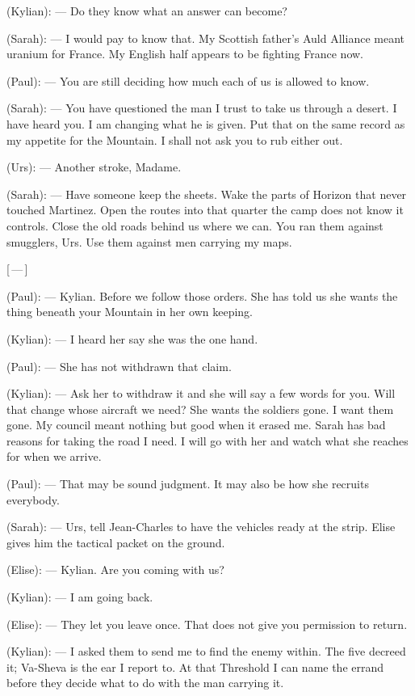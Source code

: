 \begin{room}
(Kylian): --- Do they know what an answer can become?

(Sarah): --- I would pay to know that. My Scottish father's Auld Alliance meant uranium for France. My English half appears to be fighting France now.

(Paul): --- You are still deciding how much each of us is allowed to know.

(Sarah): --- You have questioned the man I trust to take us through a desert. I have heard you. I am changing what he is given. Put that on the same record as my appetite for the Mountain. I shall not ask you to rub either out.

(Urs): --- Another stroke, Madame.

(Sarah): --- Have someone keep the sheets. Wake the parts of Horizon that never touched Martinez. Open the routes into that quarter the camp does not know it controls. Close the old roads behind us where we can. You ran them against smugglers, Urs. Use them against men carrying my maps.

\centerline{[\,---\,]}

(Paul): --- Kylian. Before we follow those orders. She has told us she wants the thing beneath your Mountain in her own keeping.

(Kylian): --- I heard her say she was the one hand.

(Paul): --- She has not withdrawn that claim.

(Kylian): --- Ask her to withdraw it and she will say a few words for you. Will that change whose aircraft we need? She wants the soldiers gone. I want them gone. My council meant nothing but good when it erased me. Sarah has bad reasons for taking the road I need. I will go with her and watch what she reaches for when we arrive.

(Paul): --- That may be sound judgment. It may also be how she recruits everybody.

(Sarah): --- Urs, tell Jean-Charles to have the vehicles ready at the strip. Elise gives him the tactical packet on the ground.

(Elise): --- Kylian. Are you coming with us?

(Kylian): --- I am going back.

(Elise): --- They let you leave once. That does not give you permission to return.

(Kylian): --- I asked them to send me to find the enemy within. The five decreed it; Va-Sheva is the ear I report to. At that Threshold I can name the errand before they decide what to do with the man carrying it.


\end{room}
